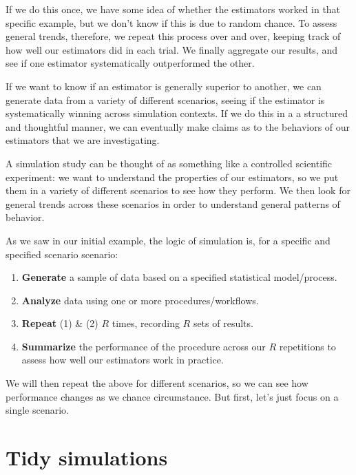 \documentclass[
]{book}
\begin{document}
If we do this once, we have some idea of whether the estimators worked in that specific example, but we don't know if this is due to random chance.
To assess general trends, therefore, we repeat this process over and over, keeping track of how well our estimators did in each trial.
We finally aggregate our results, and see if one estimator systematically outperformed the other.

If we want to know if an estimator is generally superior to another, we can generate data from a variety of different scenarios, seeing if the estimator is systematically winning across simulation contexts. If we do this in a a structured and thoughtful manner, we can eventually make claims as to the behaviors of our estimators that we are investigating.

A simulation study can be thought of as something like a controlled scientific experiment: we want to understand the properties of our estimators, so we put them in a variety of different scenarios to see how they perform. We then look for general trends across these scenarios in order to understand general patterns of behavior.

As we saw in our initial example, the logic of simulation is, for a specific and specified scenario scenario:

\begin{enumerate}
\def\labelenumi{\arabic{enumi}.}
\item
  \textbf{Generate} a sample of data based on a specified statistical model/process.
\item
  \textbf{Analyze} data using one or more procedures/workflows.
\item
  \textbf{Repeat} (1) \& (2) \(R\) times, recording \(R\) sets of results.
\item
  \textbf{Summarize} the performance of the procedure across our \(R\) repetitions to assess how well our estimators work in practice.
\end{enumerate}

We will then repeat the above for different scenarios, so we can see how performance changes as we chance circumstance.
But first, let's just focus on a single scenario.

\hypertarget{tidy-simulations}{%
\section{Tidy simulations}\label{tidy-simulations}}
\end{document}
